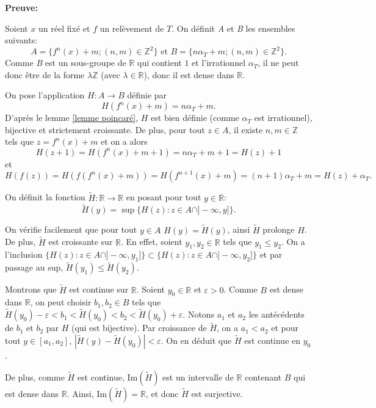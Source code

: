 \documentclass[11pt,a4 paper]{article}
\newcommand{\Rbb}{\mathbb{R}}
\begin{document}
	\textbf{Preuve:}
	\par Soient $x$ un réel fixé et $f$ un relèvement de $T$. On définit \textit{A} et\textit{ B} les ensembles suivants:
	$$A =\lbrace f^n(x)+m; (n,m) \in \mathbb{Z}^2 \rbrace \text{ et } B=\lbrace n\alpha_T +m; (n,m)\in \mathbb{Z}^2\rbrace.$$
	Comme \textit{B} est un sous-groupe de $\Rbb$ qui contient $1$ et l'irrationnel $\alpha_T$, il ne peut donc être de la forme $\lambda \mathbb{Z}$ (avec $\lambda \in \Rbb$), donc il est dense dans $\Rbb$.\\
	\par On pose l'application $H: A\to B$ définie par $$H(f^n(x)+m)= n \alpha_T +m.$$ D'après le lemme \ref{lemme poincaré}, $H$ est bien définie (comme $\alpha_T$ est irrationnel), bijective et strictement croissante. De plus, pour tout $z \in A$, il existe $n,m\in \mathbb{Z}$ tels que $z=f^n(x)+m$ et on a alors $$H(z+1)=H(f^n(x)+m+1)=n\alpha_T+m+1=H(z)+1$$
	et $$H(f(z))=H(f(f^n(x)+m))=H(f^{n+1}(x)+m)=(n+1)\alpha_T +m =H(z)+\alpha_T.$$
	
	\par On définit la fonction $\widetilde{H}:\Rbb \to \Rbb$ en posant pour tout $y \in \Rbb$:
	$$\widetilde{H}(y)= \sup \lbrace H(z): z \in A \cap ]-\infty,y]\rbrace.$$
	
	
	\par  On vérifie facilement que pour tout $y \in A$ $H(y)=\widetilde{H}(y)$, ainsi $\widetilde{H}$ prolonge $H$. De plus, $\widetilde{H}$ est croissante sur $\Rbb$. En effet, soient $y_1, y_2 \in \Rbb$ tels que $y_1\leq y_2$. On a l'inclusion $\lbrace H(z): z \in A \cap ]-\infty,y_1]\rbrace \subset \lbrace H(z): z \in A \cap ]-\infty,y_2]\rbrace$ et par passage au sup, $\widetilde{H}(y_1)\leq \widetilde{H}(y_2)$.\\
	
	\par Montrons que $\widetilde{H}$ est continue sur $\Rbb$. Soient $y_0 \in \Rbb$ et $\varepsilon >0$. Comme $B$ est dense dans $\Rbb$, on peut choisir $b_1, b_2 \in B$ tels que $\widetilde{H}(y_0)-\varepsilon < b_1 < \widetilde{H}(y_0) <b_2<\widetilde{H}(y_0)+\varepsilon$. Notons $a_1$ et $a_2$ les antécédents de $b_1$ et $b_2$ par $H$ (qui est bijective). Par croissance de $\widetilde{H}$, on a $a_1<a_2$ et pour tout $y\in [a_1,a_2]$, $|\widetilde{H}(y)-\widetilde{H}(y_0)|<\varepsilon$. On en déduit que $\widetilde{H}$ est continue en $y_0$.\\
	
	
	\par De plus, comme $\widetilde{H}$ est continue, $\mathrm{Im}(\widetilde{H})$ est un intervalle de $\Rbb$ contenant $B$ qui est dense dans $\Rbb$. Ainsi, $\mathrm{Im}(\widetilde{H})=\Rbb$, et donc $\widetilde{H}$ est surjective.\\
	
\end{document}
